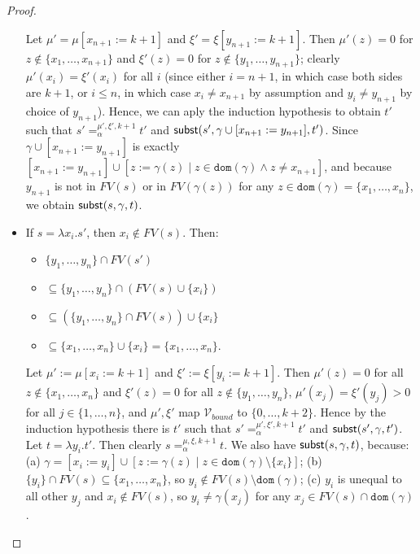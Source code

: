 \documentclass{lmcs}
\theoremstyle{theorem}\newtheorem{theorem}[dummy]{Theorem}
\theoremstyle{theorem}\newtheorem{lemma}[dummy]{Lemma}
\theoremstyle{theorem}\newtheorem{corollary}[dummy]{Corollary}
\theoremstyle{definition}\newtheorem{definition}[dummy]{Definition}
\theoremstyle{definition}\newtheorem{example}[dummy]{Example}
\newcommand{\Vbound}{\mathcal{V}_{\mathit{bound}}}
\newcommand{\FV}{\mathit{FV}}
\newcommand{\domain}{\mathtt{dom}}
\newcommand{\abs}[2]{\lambda #1.#2}
\begin{document}
\begin{proof}
\begin{itemize}
\begin{itemize}
  \end{itemize}
  Let $\mu' = \mu[x_{n+1}:=k+1]$ and $\xi' = \xi[y_{n+1}:=k+1]$.
  Then $\mu'(z) = 0$ for $z \notin \{x_1,\dots,x_{n+1}\}$ and $\xi'(z) = 0$ for $z \notin \{y_1,
  \dots,y_{n+1}\}$; clearly $\mu'(x_i) = \xi'(x_i)$ for all $i$ (since either $i = n+1$, in which
  case both sides are $k+1$, or $i \leq n$, in which case $x_i \neq x_{n+1}$ by assumption and
  $y_i \neq y_{n+1}$ by choice of $y_{n+1}$).
  Hence, we can aply the induction hypothesis to obtain $t'$ such that
  $s' =_\alpha^{\mu',\xi',k+1} t'$ and $\mathsf{subst}(s',\gamma \cup [x_{n+1}:=y_{n+1}],t')$.
  Since $\gamma \cup [x_{n+1}:=y_{n+1}]$ is exactly $[x_{n+1}:=y_{n+1}] \cup [z:=\gamma(z) \mid 
  z \in \domain(\gamma) \wedge z \neq x_{n+1}]$, and because $y_{n+1}$ is not in $\FV(s)$ or in
  $\FV(\gamma(z))$ for any $z \in \domain(\gamma) = \{x_1,\dots,x_n\}$, 
  we obtain $\mathsf{subst}(s,\gamma,t)$.
\item
  If $s = \abs{x_i}{s'}$, then $x_i \notin \FV(s)$.  Then:
  \begin{itemize}
  \item[] $\{y_1,\dots,y_n\} \cap \FV(s')$
  \item[] $\subseteq \{ y_1,\dots,y_n\} \cap (\FV(s) \cup \{x_i\})$
  \item[] $\subseteq (\{ y_1,\dots,y_n \} \cap \FV(s)) \cup \{x_i\}$
  \item[] $\subseteq \{x_1,\dots,x_n\} \cup \{x_i\} = \{x_1,\dots,x_n\}$. \\
  \end{itemize}
  Let $\mu' := \mu[x_i:=k+1]$ and $\xi' := \xi[y_i:=k+1]$.  Then $\mu'(z) = 0$ for all $z \notin
  \{x_1,\dots,x_n\}$ and $\xi'(z) = 0$ for all $z \notin \{y_1,\dots,y_n\}$, $\mu'(x_j) = \xi'(y_j)
  > 0$ for all $j \in \{1,\dots,n\}$, and $\mu',\xi'$ map $\Vbound$ to $\{0,\dots,k+2\}$.
  Hence by the induction hypothesis there is $t'$ such that $s' =_\alpha^{\mu',\xi',k+1} t'$ and
  $\mathsf{subst}(s',\gamma,t')$.
  Let $t = \abs{y_i}{t'}$.  Then clearly $s =_\alpha^{\mu,\xi,k+1} t$.  We also have $\mathsf{subst}(s,
  \gamma,t)$, because:
  (a) $\gamma = [x_i:=y_i] \cup [z:=\gamma(z) \mid z \in \domain(\gamma) \setminus \{x_i\}]$;
  (b) $\{y_i\} \cap \FV(s) \subseteq \{x_1,\dots,x_n\}$, so $y_i \notin \FV(s) \setminus
    \domain(\gamma)$;
  (c) $y_i$ is unequal to all other $y_j$ and $x_i \notin \FV(s)$, so $y_i \neq \gamma(x_j)$ for
    any $x_j \in \FV(s) \cap \domain(\gamma)$.
  \qedhere
\end{itemize}
\end{proof}
\end{document}
